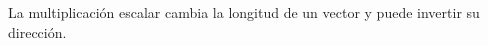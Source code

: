 \documentclass[preview]{standalone}
\begin{document}
\begin{center}
La multiplicación escalar cambia la longitud de un vector y puede invertir su dirección.
\end{center}
\end{document}
